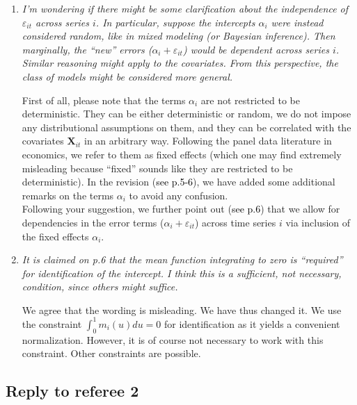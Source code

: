\documentclass[a4paper,12pt]{article}
\newcommand{\reference}[1]{\textcolor{black}{#1}}
\begin{document}
\begin{enumerate}[label=\arabic*.,leftmargin=0.6cm]
\item \textit{I'm wondering if there might be some clarification about the independence of $\varepsilon_{it}$ across series $i$. In particular, suppose the intercepts $\alpha_i$ were instead considered random, like in mixed modeling (or Bayesian inference). Then marginally, the ``new'' errors ($\alpha_i + \varepsilon_{it}$) would be dependent across series $i$. Similar reasoning might apply to the covariates. From this perspective, the class of models might be considered more general.}

First of all, please note that the terms $\alpha_i$ are not restricted to be deterministic. They can be either deterministic or random, we do not impose any distributional assumptions on them, and they can be correlated with the covariates $\boldsymbol{X}_{it}$ in an arbitrary way. Following the panel data literature in economics, we refer to them as fixed effects (which one may find extremely misleading because ``fixed'' sounds like they are restricted to be deterministic). In the revision (\reference{see p.5-6}), we have added some additional remarks on the terms $\alpha_i$ to avoid any confusion. \\
Following your suggestion, we further point out (\reference{see p.6}) that we allow for dependencies in the error terms ($\alpha_i + \varepsilon_{it}$) across time series $i$ via inclusion of the fixed effects $\alpha_i$.   
  
  
\item \textit{It is claimed on p.6 that the mean function integrating to zero is ``required'' for identification of the intercept. I think this is a sufficient, not necessary, condition, since others might suffice.} 

We agree that the wording is misleading. We have thus changed it. We use the constraint $\int_0^1 m_i(u) du = 0$ for identification as it yields a convenient normalization. However, it is of course not necessary to work with this constraint. Other constraints are possible.  


\end{enumerate}



\subsection*{Reply to referee 2}
\end{document}
